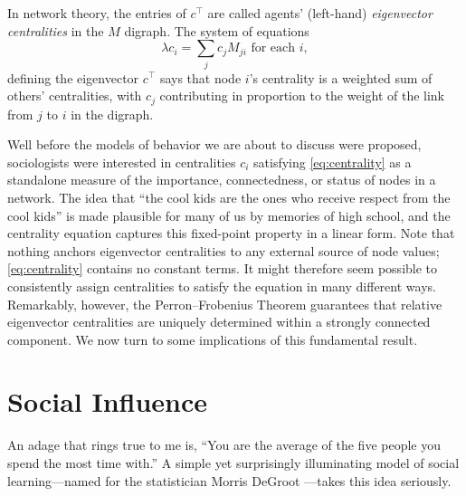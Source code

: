 \documentclass{notices}
\theoremstyle{definition}\newtheorem{problem}{Problem}
\begin{document}
In network theory, the entries of $c^\top$ are called agents' (left-hand) \emph{eigenvector centralities} in the $M$ digraph. The system of equations \begin{equation} \label{eq:centrality} \lambda c_i=\sum_j c_j M_{ji}  \text{ for each $i$},\end{equation} defining the eigenvector $c^\top$ says that node $i$'s centrality is a weighted sum of others' centralities, with $c_j$ contributing in proportion to the weight of the link from $j$ to $i$ in the digraph.

Well before the models of behavior we are about to discuss were proposed, sociologists were interested in centralities $c_i$ satisfying \cref{eq:centrality} as a standalone measure of the importance, connectedness, or status of nodes in a network. The idea that ``the cool kids are the ones who receive respect from the cool kids'' is made plausible for many of us by memories of high school, and the centrality equation captures this fixed-point property in a linear form. Note that nothing anchors eigenvector centralities to any external source of node values;  \cref{eq:centrality} contains no constant terms. It might therefore seem possible to consistently assign centralities to satisfy the equation in many different ways. Remarkably, however, the Perron--Frobenius Theorem guarantees that relative eigenvector centralities are uniquely determined within a strongly connected component. We now turn to some implications of this fundamental result.



\section*{Social Influence}

An adage that rings true to me is, ``You are the average of the five people you spend the most time with.'' A simple yet surprisingly illuminating model of social learning---named for the statistician Morris DeGroot \cite{degroot1974reaching}---takes this idea seriously.
\end{document}
